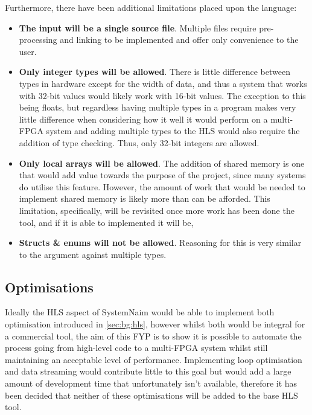 Furthermore, there have been additional limitations placed upon the language:

\begin{itemize}
    \item \textbf{The input will be a single source file}. Multiple files require pre-processing and linking to be implemented and offer only convenience to the user.
    \item \textbf{Only integer types will be allowed}. There is little difference between types in hardware except for the width of data, and thus a system that works with 32-bit values would likely work with 16-bit values. The exception to this being floats, but regardless having multiple types in a program makes very little difference when considering how it well it would perform on a multi-FPGA system and adding multiple types to the HLS would also require the addition of type checking. Thus, only 32-bit integers are allowed.
    \item \textbf{Only local arrays will be allowed}. The addition of shared memory is one that would add value towards the purpose of the project, since many systems do utilise this feature. However, the amount of work that would be needed to implement shared memory is likely more than can be afforded. This limitation, specifically, will be revisited once more work has been done the tool, and if it is able to implemented it will be,
    \item \textbf{Structs \& enums will not be allowed}. Reasoning for this is very similar to the argument against multiple types.
\end{itemize}


\subsection{Optimisations}

Ideally the HLS aspect of SystemNaim would be able to implement both optimisation introduced in \autoref{sec:bg:hls}, however whilst both would be integral for a commercial tool, the aim of this FYP is to show it is possible to automate the process going from high-level code to a multi-FPGA system whilst still maintaining an acceptable level of performance. Implementing  loop optimisation and data streaming would contribute little to this goal but would add a large amount of development time that unfortunately isn't available, therefore it has been decided that neither of these optimisations will be added to the base HLS tool.

